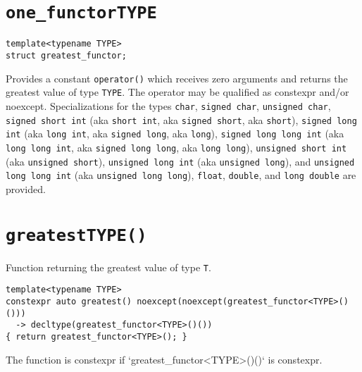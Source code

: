 \section{\texttt{one\_functor\textlangle TYPE\textrangle}}
\begin{verbatim}
template<typename TYPE>
struct greatest_functor;
\end{verbatim}
Provides a constant \texttt{operator()} which receives zero arguments and returns
the
greatest
value of type \texttt{TYPE}. The operator may be qualified as constexpr
and/or noexcept. Specializations for the types
\texttt{char},
\texttt{signed char},
\texttt{unsigned char},
\texttt{signed short int}       (aka \texttt{short int},     aka \texttt{signed short},     aka \texttt{short}),
\texttt{signed long int}        (aka \texttt{long int},      aka \texttt{signed long},      aka \texttt{long}),
\texttt{signed long long int}   (aka \texttt{long long int}, aka \texttt{signed long long}, aka \texttt{long long}),
\texttt{unsigned short int}     (aka \texttt{unsigned short}),
\texttt{unsigned long int}      (aka \texttt{unsigned long}), and
\texttt{unsigned long long int} (aka \texttt{unsigned long long}),
\texttt{float},
\texttt{double}, and
\texttt{long double}
are provided.

\section{\texttt{greatest\textlangle TYPE\textrangle()}}
Function returning the greatest value of type \texttt{T}.
\begin{verbatim}
template<typename TYPE>
constexpr auto greatest() noexcept(noexcept(greatest_functor<TYPE>()()))
  -> decltype(greatest_functor<TYPE>()())
{ return greatest_functor<TYPE>(); }
\end{verbatim}
The function is constexpr if `greatest_functor<TYPE>()()` is constexpr.
